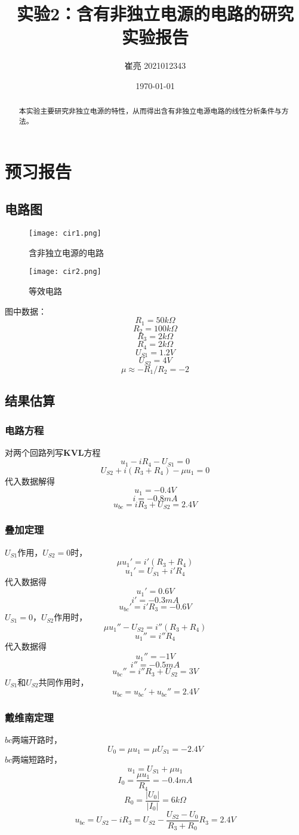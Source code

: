 \documentclass[12pt,a4paper,oneside,left=3.18,right=3.18,top=2.54,bottom=2.54]{ctexart}
\title{实验2：含有非独立电源的电路的研究 \\ 实验报告}
\author{崔亮 2021012343}
\date{\today}
\begin{document}
\maketitle
\begin{abstract}
本实验主要研究非独立电源的特性，从而得出含有非独立电源电路的线性分析条件与方法。
\end{abstract}
\newpage
\tableofcontents
\newpage

\section{预习报告}
	\subsection{电路图}
		\begin{figure}[H]
		\centering
		\texttt{[image: cir1.png]}
		\caption{含非独立电源的电路}
		\label{figure1}
		\texttt{[image: cir2.png]}
		\caption{等效电路}
		\label{figure2}
		\end{figure}
		\noindent
		图中数据：
		$$R_{1}=50k \Omega $$
		$$R_{2}=100k \Omega $$
		$$R_{3}=2k \Omega $$
		$$R_{4}=2k \Omega $$
		$$U_{S1}=1.2V$$
		$$U_{S2}=4V$$
		$$\mu \approx -R_{1}/R_{2}=-2$$
	\subsection{结果估算}
		\subsubsection{电路方程}
			\noindent
			对两个回路列写$\boldsymbol{KVL}$方程
			$$u_1-iR_4-U_{S1}=0$$
			$$U_{S2}+i(R_3+R_4)-\mu u_1=0$$
			代入数据解得
			$$u_1=-0.4V$$
			$$i=-0.8mA$$
			$$u_{bc}=iR_3+U_{S2}=2.4V$$
		\subsubsection{叠加定理}
			\noindent
			$U_{S1}$作用，$U_{S2}=0$时，
			$$\mu u_1'=i'(R_3+R_4)$$
			$$u_1'=U_{S1}+i'R_4$$
			代入数据得
			$$u_1'=0.6V$$
			$$i'=-0.3mA$$
			$$u_{bc}'=i'R_3=-0.6V$$
			$U_{S1}=0$，$U_{S2}$作用时，
			$$\mu u_1''-U_{S2}=i''(R_3+R_4)$$
			$$u_1''=i''R_4$$
			代入数据得
			$$u_1''=-1V$$
			$$i''=-0.5mA$$
			$$u_{bc}''=i''R_3+U_{S2}=3V$$
			$U_{S1}$和$U_{S2}$共同作用时，
			$$u_{bc}=u_{bc}'+u_{bc}''=2.4V$$
			
		\subsubsection{戴维南定理}
			\noindent
			$bc$两端开路时，
			$$U_0=\mu u_1=\mu U_{S1}=-2.4V$$
			$bc$两端短路时，
			$$u_1=U_{S1}+\mu u_1$$
			$$I_0=\dfrac{\mu u_1}{R_4}=-0.4mA$$
			$$R_0=\dfrac{|U_0|}{|I_0|}=6k\Omega$$
			$$u_{bc}=U_{S2}-iR_3=U_{S2}-\dfrac{U_{S2}-U_0}{R_3+R_0}R_3=2.4V$$
\end{document}
